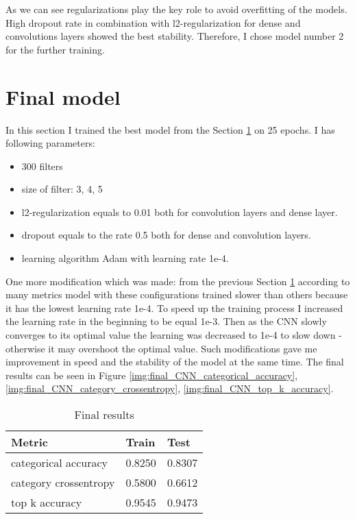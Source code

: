 As we can see regularizations play the key role to avoid overfitting of the models. High dropout rate in combination with l2-regularization for dense and convolutions layers showed the best stability. Therefore, I chose model number 2 for the further training. 

\clearpage
\section{Final model} \label{sect4_5}

In this section I trained the best model from the Section \ref{sect4_5} on 25 epochs.
I has following parameters:

\begin{itemize}
	\item 300 filters
	\item size of filter: 3, 4, 5
	\item l2-regularization equals to 0.01 both for convolution layers and dense layer. 
	\item dropout equals to the rate 0.5 both for dense and convolution layers. 
	\item learning algorithm Adam with learning rate 1e-4. 
\end{itemize}

One more modification which was made: from the previous Section \ref{sect4_5}
according to many metrics model with these configurations trained slower than others because 
it has the lowest learning rate 1e-4. To speed up the training process I increased the learning rate in the beginning to be equal 1e-3. Then as the CNN slowly converges to its optimal value
the learning was decreased to 1e-4 to slow down - otherwise it may overshoot the optimal value.
Such modifications gave me improvement in speed and the stability of the model at the same time.
The final results can be seen in Figure \ref{img:final_CNN_categorical_accuracy}, 
\ref{img:final_CNN_category_crossentropy}, \ref{img:final_CNN_top_k_accuracy}.


\begin{table}[h]
	\centering
	\caption{Final results}
	\label{my-label}
	\begin{tabular}{| p{7cm} | p{3cm} | p{3cm} |}
		\hline
		\textbf{Metric}  & \textbf{Train} & \textbf{Test}                                                    
		\\ \hline
		categorical accuracy   &  0.8250 & 0.8307
		\\ \hline
		category crossentropy  &   0.5800 & 0.6612
		\\ \hline
		top k accuracy   &  0.9545 & 0.9473
		\\ \hline		
	\end{tabular}
\end{table}




